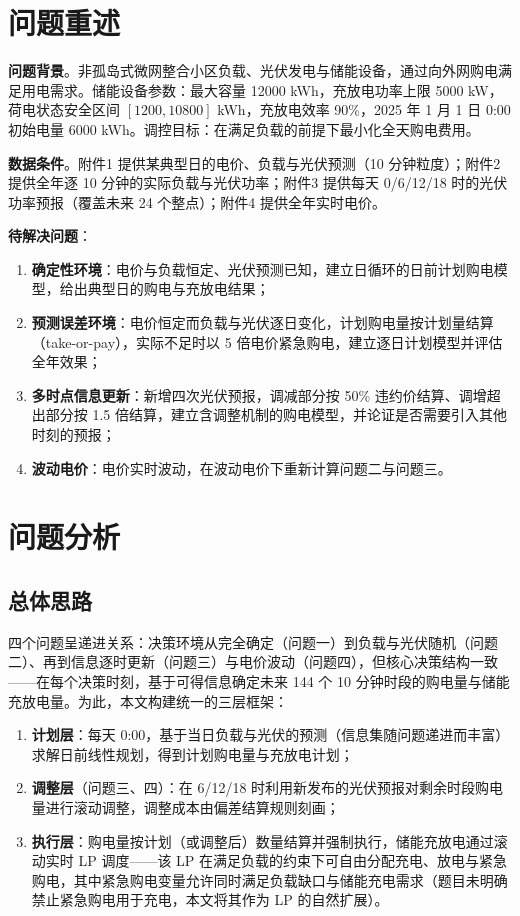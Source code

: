 \documentclass[zihao=-4,a4paper,UTF8,fontset=none]{ctexart}
\begin{document}
\section{问题重述}

\textbf{问题背景}。非孤岛式微网整合小区负载、光伏发电与储能设备，通过向外网购电满足用电需求。储能设备参数：最大容量 12000 kWh，充放电功率上限 5000 kW，荷电状态安全区间 $[1200, 10800]$ kWh，充放电效率 90\%，2025 年 1 月 1 日 0:00 初始电量 6000 kWh。调控目标：在满足负载的前提下最小化全天购电费用。

\textbf{数据条件}。附件1 提供某典型日的电价、负载与光伏预测（10 分钟粒度）；附件2 提供全年逐 10 分钟的实际负载与光伏功率；附件3 提供每天 0/6/12/18 时的光伏功率预报（覆盖未来 24 个整点）；附件4 提供全年实时电价。

\textbf{待解决问题}：
\begin{enumerate}
  \item \textbf{确定性环境}：电价与负载恒定、光伏预测已知，建立日循环的日前计划购电模型，给出典型日的购电与充放电结果；
  \item \textbf{预测误差环境}：电价恒定而负载与光伏逐日变化，计划购电量按计划量结算（take-or-pay），实际不足时以 5 倍电价紧急购电，建立逐日计划模型并评估全年效果；
  \item \textbf{多时点信息更新}：新增四次光伏预报，调减部分按 50\% 违约价结算、调增超出部分按 1.5 倍结算，建立含调整机制的购电模型，并论证是否需要引入其他时刻的预报；
  \item \textbf{波动电价}：电价实时波动，在波动电价下重新计算问题二与问题三。
\end{enumerate}

\section{问题分析}

\subsection{总体思路}

四个问题呈递进关系：决策环境从完全确定（问题一）到负载与光伏随机（问题二）、再到信息逐时更新（问题三）与电价波动（问题四），但核心决策结构一致——在每个决策时刻，基于可得信息确定未来 144 个 10 分钟时段的购电量与储能充放电量。为此，本文构建统一的三层框架：

\begin{enumerate}
  \item \textbf{计划层}：每天 0:00，基于当日负载与光伏的预测（信息集随问题递进而丰富）求解日前线性规划，得到计划购电量与充放电计划；
  \item \textbf{调整层}（问题三、四）：在 6/12/18 时利用新发布的光伏预报对剩余时段购电量进行滚动调整，调整成本由偏差结算规则刻画；
  \item \textbf{执行层}：购电量按计划（或调整后）数量结算并强制执行，储能充放电通过滚动实时 LP 调度——该 LP 在满足负载的约束下可自由分配充电、放电与紧急购电，其中紧急购电变量允许同时满足负载缺口与储能充电需求（题目未明确禁止紧急购电用于充电，本文将其作为 LP 的自然扩展）。
\end{enumerate}
\end{document}
